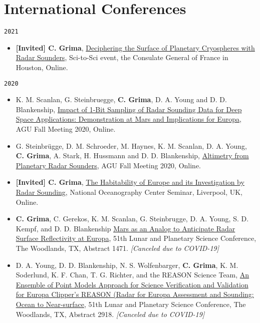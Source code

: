 \section*{International Conferences}


\noindent\texttt{2021}

\begin{itemize}
\item
  \textbf{{[}Invited{]} C. Grima}, \href{https://}{Deciphering the Surface of Planetary Cryospheres with Radar Sounders}, Sci-to-Sci event, the Consulate General of France in Houston, Online.

\end{itemize}

\noindent\texttt{2020}

\begin{itemize}
\item
  K. M. Scanlan, G. Steinbruegge, \textbf{C. Grima}, D. A. Young and D. D. Blankenship, \href{https://agu.confex.com/agu/fm20/webprogram/Paper742180.html}{Impact of 1-Bit Sampling of Radar Sounding Data for Deep Space Applications: Demonstration at Mars and Implications for Europa}, AGU Fall Meeting 2020, Online.
\item
  G. Steinbrügge, D. M. Schroeder, M. Haynes, K. M. Scanlan, D. A. Young, \textbf{C. Grima}, A. Stark, H. Hussmann and D. D. Blankenship, \href{https://agu.confex.com/agu/fm20/webprogram/Paper672813.html}{Altimetry from Planetary Radar Sounders}, AGU Fall Meeting 2020, Online.
\item
  \textbf{{[}Invited{]} C. Grima}, \href{https://noc.ac.uk/seminars/liverpool/habitability-europe-its-investigation-radar-sounding}{The Habitability of Europe and its Investigation by Radar Sounding}, National Oceanography Center Seminar, Liverpool, UK, Online.
\item
  \textbf{C. Grima}, C. Gerekos,  K. M. Scanlan,  G. Steinbrugge, D. A. Young, S. D. Kempf, and D. D. Blankenship \href{https://www.hou.usra.edu/meetings/lpsc2020/pdf/1471.pdf}{Mars as an Analog to Anticipate Radar Surface Reflectivity at Europa}, 51th Lunar and Planetary Science Conference, The Woodlands, TX, Abstract 1471. \emph{[Canceled due to COVID-19]}
\item
  D. A. Young, D. D. Blankenship, N. S. Wolfenbarger, \textbf{C. Grima}, K. M. Soderlund, K. F. Chan, T. G. Richter, and the REASON Science Team, \href{https://www.hou.usra.edu/meetings/lpsc2020/pdf/2918.pdf}{An Ensemble of Point Models Approach for Science Verification and Validation for Europa Clipper's REASON (Radar for Europa Assessment and Sounding: Ocean to Near-surface}, 51th Lunar and Planetary Science Conference, The Woodlands, TX, Abstract 2918. \emph{[Canceled due to COVID-19]}

\end{itemize}
